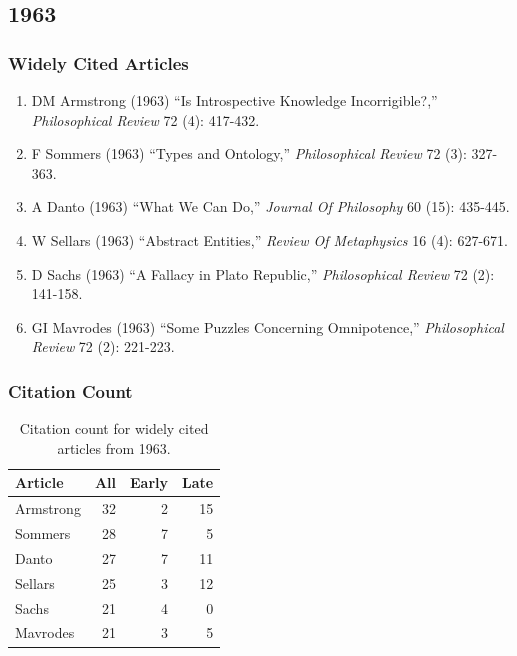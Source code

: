 \documentclass[
  10pt,
  letterpaper,
  DIV=11,
  numbers=noendperiod,
  twoside]{scrartcl}
\providecommand{\tightlist}{%
  \setlength{\itemsep}{0pt}\setlength{\parskip}{0pt}}\usepackage{longtable,booktabs,array}
\begin{document}
\newpage

\subsection{1963}\label{sec-s1963}

\subsubsection*{Widely Cited Articles}\label{widely-cited-articles-7}

\begin{enumerate}
\def\labelenumi{\arabic{enumi}.}
\tightlist
\item
  DM Armstrong (1963) ``Is Introspective Knowledge Incorrigible?,''
  \emph{Philosophical Review} 72 (4): 417-432.
\item
  F Sommers (1963) ``Types and Ontology,'' \emph{Philosophical Review}
  72 (3): 327-363.
\item
  A Danto (1963) ``What We Can Do,'' \emph{Journal Of Philosophy} 60
  (15): 435-445.
\item
  W Sellars (1963) ``Abstract Entities,'' \emph{Review Of Metaphysics}
  16 (4): 627-671.
\item
  D Sachs (1963) ``A Fallacy in Plato Republic,'' \emph{Philosophical
  Review} 72 (2): 141-158.
\item
  GI Mavrodes (1963) ``Some Puzzles Concerning Omnipotence,''
  \emph{Philosophical Review} 72 (2): 221-223.
\end{enumerate}

\subsubsection*{Citation Count}\label{sec-count-1963}

\begin{longtable}[]{@{}lrrr@{}}

\caption{\label{tbl-citation-count-1963}Citation count for widely cited
articles from 1963.}

\tabularnewline

\toprule\noalign{}
Article & All & Early & Late \\
\midrule\noalign{}
\endhead
\bottomrule\noalign{}
\endlastfoot
Armstrong & 32 & 2 & 15 \\
Sommers & 28 & 7 & 5 \\
Danto & 27 & 7 & 11 \\
Sellars & 25 & 3 & 12 \\
Sachs & 21 & 4 & 0 \\
Mavrodes & 21 & 3 & 5 \\

\end{longtable}
\end{document}
